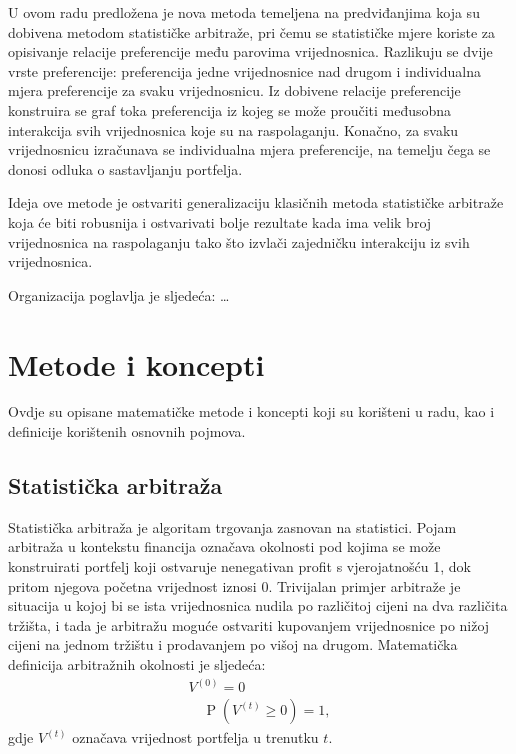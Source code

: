\documentclass[lmodern, utf8, diplomski, numeric]{fer}
\newcommand{\prob}[1]{\operatorname{P}\q(#1\w)}
\newcommand{\q}{\left}
\newcommand{\w}{\right}
\begin{document}
  U ovom radu predložena je nova metoda temeljena na predviđanjima koja su dobivena metodom statističke arbitraže, pri čemu se statističke mjere koriste za opisivanje relacije preferencije među parovima vrijednosnica.
  Razlikuju se dvije vrste preferencije: preferencija jedne vrijednosnice nad drugom i individualna mjera preferencije za svaku vrijednosnicu.
  Iz dobivene relacije preferencije konstruira se graf toka preferencija iz kojeg se može proučiti međusobna interakcija svih vrijednosnica koje su na raspolaganju.
  Konačno, za svaku vrijednosnicu izračunava se individualna mjera preferencije, na temelju čega se donosi odluka o sastavljanju portfelja.
  
  Ideja ove metode je ostvariti generalizaciju klasičnih metoda statističke arbitraže koja će biti robusnija i ostvarivati bolje rezultate kada ima velik broj vrijednosnica na raspolaganju tako što izvlači zajedničku interakciju iz svih vrijednosnica.
  
  Organizacija poglavlja je sljedeća: \ldots

\chapter{Metode i koncepti}
  Ovdje su opisane matematičke metode i koncepti koji su korišteni u radu, kao i definicije korištenih osnovnih pojmova.
  
  \section{Statistička arbitraža}
  Statistička arbitraža  je algoritam trgovanja zasnovan na statistici.
  Pojam arbitraža u kontekstu financija označava okolnosti pod kojima se može konstruirati portfelj koji ostvaruje nenegativan profit s vjerojatnošću 1, dok pritom njegova početna vrijednost iznosi 0.
  Trivijalan primjer arbitraže je situacija u kojoj bi se ista vrijednosnica nudila po različitoj cijeni na dva različita tržišta, i tada je arbitražu moguće ostvariti kupovanjem vrijednosnice po nižoj cijeni na jednom tržištu i prodavanjem po višoj na drugom.
  Matematička definicija arbitražnih okolnosti je sljedeća:
  \begin{equation}
  \begin{gathered}
  \label{eq:statarb}
  V^{(0)} = 0\\
  \quad \prob{V^{\q(t\w)} \ge 0} = 1,
  \end{gathered}
  \end{equation}
  gdje $V^{\q(t\w)}$ označava vrijednost portfelja u trenutku $t$.
\end{document}
